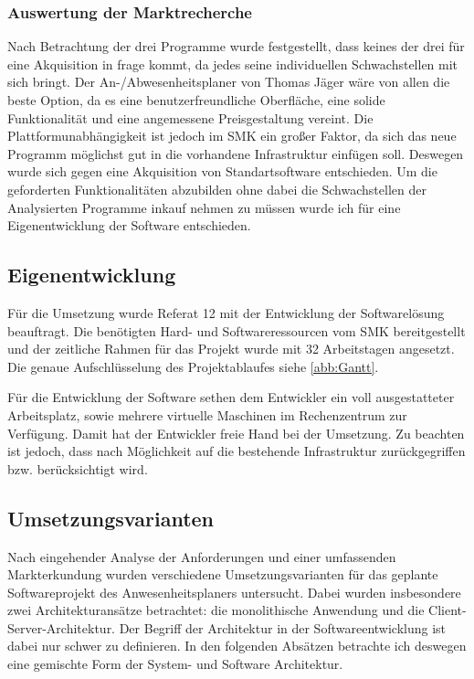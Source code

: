 \subsubsection{Auswertung der Marktrecherche}
\label{sec:AuswertungMarktrecherche}
Nach Betrachtung der drei Programme wurde festgestellt, dass keines der drei für eine Akquisition in frage kommt, da jedes seine individuellen Schwachstellen mit sich bringt. Der An-/Abwesenheitsplaner von Thomas Jäger wäre von allen die beste Option, da es eine benutzerfreundliche Oberfläche, eine solide Funktionalität und eine angemessene Preisgestaltung vereint. Die Plattformunabhängigkeit ist jedoch im SMK ein großer Faktor, da sich das neue Programm möglichst gut in die vorhandene Infrastruktur einfügen soll. Deswegen wurde sich gegen eine Akquisition von Standartsoftware entschieden. Um die geforderten Funktionalitäten abzubilden ohne dabei die Schwachstellen der Analysierten Programme inkauf nehmen zu müssen wurde ich für eine Eigenentwicklung der Software entschieden.

\subsection{Eigenentwicklung}
\label{sec:Eigenentwicklung}
Für die Umsetzung wurde Referat 12 mit der Entwicklung der Softwarelösung beauftragt. Die benötigten Hard- und Softwareressourcen vom SMK bereitgestellt und der zeitliche Rahmen für das Projekt wurde mit 32 Arbeitstagen angesetzt. Die genaue Aufschlüsselung des Projektablaufes siehe \ref{abb:Gantt}.

Für die Entwicklung der Software sethen dem Entwickler ein voll ausgestatteter Arbeitsplatz, sowie mehrere virtuelle Maschinen im Rechenzentrum zur Verfügung. Damit hat der Entwickler freie Hand bei der Umsetzung. Zu beachten ist jedoch, dass nach Möglichkeit auf die bestehende Infrastruktur zurückgegriffen bzw. berücksichtigt wird.


\subsection{Umsetzungsvarianten}
\label{sec:Umsetzungsvarianten}
Nach eingehender Analyse der Anforderungen und einer umfassenden Markterkundung wurden verschiedene Umsetzungsvarianten für das geplante Softwareprojekt des Anwesenheitsplaners untersucht. Dabei wurden insbesondere zwei Architekturansätze betrachtet: die monolithische Anwendung und die Client-Server-Architektur. Der Begriff der Architektur in der Softwareentwicklung ist dabei nur schwer zu definieren. In den folgenden Absätzen betrachte ich deswegen eine gemischte Form der System- und Software Architektur.

